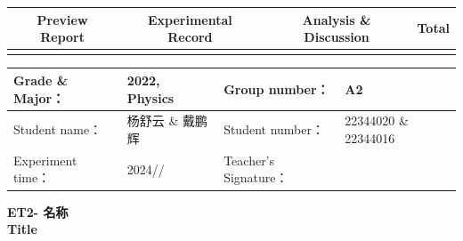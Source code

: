 


\begin{table}
	\renewcommand\arraystretch{1.7}
	\begin{tabularx}{\textwidth}{
			|X|X|X|X
			|X|X|X|X|}
		\hline
		\multicolumn{2}{|c|}{Preview Report}&\multicolumn{2}{|c|}{Experimental Record}&\multicolumn{2}{|c|}{Analysis \& Discussion}&\multicolumn{2}{|c|}{\Large\textbf{Total}}\\
		\hline
		\LARGE & & \LARGE & & \LARGE & & \LARGE & \\
		\hline
	\end{tabularx}
\end{table}


\begin{table}
	\renewcommand\arraystretch{1.7}
	\begin{tabularx}{\textwidth}{|X|X|X|X|}
		\hline
		Grade \& Major： & 2022, Physics &Group number： & A2\\
		\hline
		Student name： & 杨舒云 \& 戴鹏辉  & Student number： & 22344020 \& 22344016\\
		\hline
		Experiment time： & 2024// & Teacher's Signature： & \\
		\hline
	\end{tabularx}
\end{table}


\begin{center}
	\huge \textbf{ET2- \quad 名称\\Title}
\end{center}


